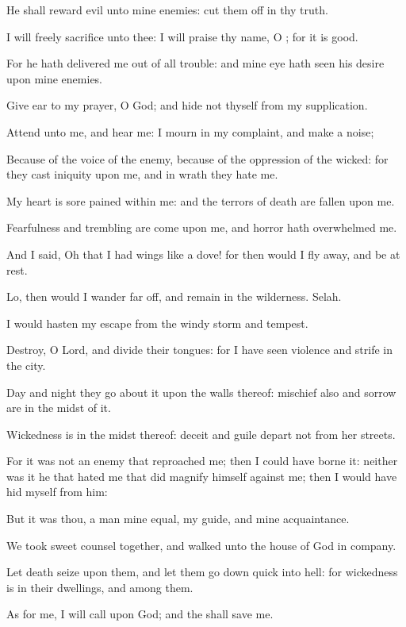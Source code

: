 \Verse He shall reward evil unto mine enemies: cut them off in thy truth.

\Verse I will freely sacrifice unto thee: I will praise thy name, O \LORD; for it is good.

\Verse For he hath delivered me out of all trouble: and mine eye hath seen his desire upon mine enemies.




\Chapter
\Verse Give ear to my prayer, O God; and hide not thyself from my supplication.

\Verse Attend unto me, and hear me: I mourn in my complaint, and make a noise;

\Verse Because of the voice of the enemy, because of the oppression of the wicked: for they cast iniquity upon me, and in wrath they hate me.

\Verse My heart is sore pained within me: and the terrors of death are fallen upon me.

\Verse Fearfulness and trembling are come upon me, and horror hath overwhelmed me.

\Verse And I said, Oh that I had wings like a dove! for then would I fly away, and be at rest.

\Verse Lo, then would I wander far off, and remain in the wilderness.  Selah.

\Verse I would hasten my escape from the windy storm and tempest.

\Verse Destroy, O Lord, and divide their tongues: for I have seen violence and strife in the city.

\Verse Day and night they go about it upon the walls thereof: mischief also and sorrow are in the midst of it.

\Verse Wickedness is in the midst thereof: deceit and guile depart not from her streets.

\Verse For it was not an enemy that reproached me; then I could have borne it: neither was it he that hated me that did magnify himself against me; then I would have hid myself from him:

\Verse But it was thou, a man mine equal, my guide, and mine acquaintance.

\Verse We took sweet counsel together, and walked unto the house of God in company.

\Verse Let death seize upon them, and let them go down quick into hell: for wickedness is in their dwellings, and among them.

\Verse As for me, I will call upon God; and the \LORD shall save me.

